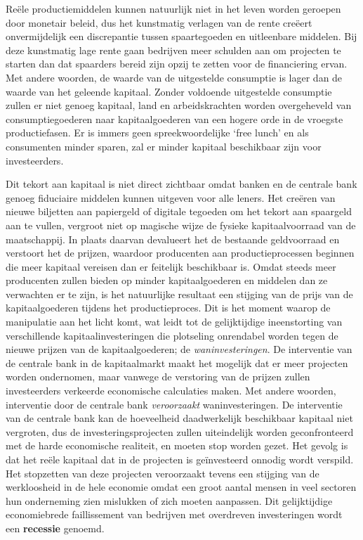 Reële productiemiddelen kunnen natuurlijk niet in het leven worden geroepen door monetair beleid, dus het kunstmatig verlagen van de rente creëert onvermijdelijk een discrepantie tussen spaartegoeden en uitleenbare middelen. Bij deze kunstmatig lage rente gaan bedrijven meer schulden aan om projecten te starten dan dat spaarders bereid zijn opzij te zetten voor de financiering ervan. Met andere woorden, de waarde van de uitgestelde consumptie is lager dan de waarde van het geleende kapitaal. Zonder voldoende uitgestelde consumptie zullen er niet genoeg kapitaal, land en arbeidskrachten worden overgeheveld van consumptiegoederen naar kapitaalgoederen van een hogere orde in de vroegste productiefasen. Er is immers geen spreekwoordelijke `free lunch' en als consumenten minder sparen, zal er minder kapitaal beschikbaar zijn voor investeerders.

Dit tekort aan kapitaal is niet direct zichtbaar omdat banken en de centrale bank genoeg fiduciaire middelen kunnen uitgeven voor alle leners. Het creëren van nieuwe biljetten aan papiergeld of digitale tegoeden om het tekort aan spaargeld aan te vullen, vergroot niet op magische wijze de fysieke kapitaalvoorraad van de maatschappij. In plaats daarvan devalueert het de bestaande geldvoorraad en verstoort het de prijzen, waardoor producenten aan productieprocessen beginnen die meer kapitaal vereisen dan er feitelijk beschikbaar is. Omdat steeds meer producenten zullen bieden op minder kapitaalgoederen en middelen dan ze verwachten er te zijn, is het natuurlijke resultaat een stijging van de prijs van de kapitaalgoederen tijdens het productieproces. Dit is het moment waarop de manipulatie aan het licht komt, wat leidt tot de gelijktijdige ineenstorting van verschillende kapitaalinvesteringen die plotseling onrendabel worden tegen de nieuwe prijzen van de kapitaalgoederen; de \emph{waninvesteringen}. De interventie van de centrale bank in de kapitaalmarkt maakt het mogelijk dat er meer projecten worden ondernomen, maar vanwege de verstoring van de prijzen zullen investeerders verkeerde economische calculaties maken. Met andere woorden, interventie door de centrale bank \emph{veroorzaakt} waninvesteringen. De interventie van de centrale bank kan de hoeveelheid daadwerkelijk beschikbaar kapitaal niet vergroten, dus de investeringsprojecten zullen uiteindelijk worden geconfronteerd met de harde economische realiteit, en moeten stop worden gezet. Het gevolg is dat het reële kapitaal dat in de projecten is geïnvesteerd onnodig wordt verspild. Het stopzetten van deze projecten veroorzaakt tevens een stijging van de werkloosheid in de hele economie omdat een groot aantal mensen in veel sectoren hun onderneming zien mislukken of zich moeten aanpassen. Dit gelijktijdige economiebrede faillissement van bedrijven met overdreven investeringen wordt een \textbf{recessie} genoemd.

